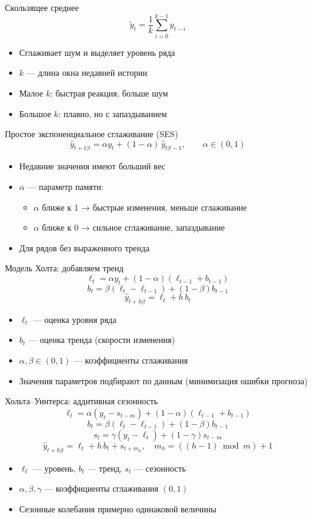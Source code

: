 \documentclass[aspectratio=1610,12pt]{beamer}
\begin{document}
\begin{frame}{Скользящее среднее}
\[
\tilde y_t=\frac{1}{k}\sum_{i=0}^{k-1} y_{t-i}
\]
\begin{itemize}
    \item Сглаживает шум и выделяет уровень ряда
    \item $k$ — длина окна недавней истории
    \item Малое $k$: быстрая реакция, больше шум
    \item Большое $k$: плавно, но с запаздыванием
\end{itemize}
\end{frame}


    \begin{frame}{Простое экспоненциальное сглаживание (SES)}
\[
\hat y_{t+1|t}
= \alpha y_t + (1-\alpha)\,\hat y_{t|t-1},
\qquad \alpha \in (0,1)
\]
\begin{itemize}
    \item Недавние значения имеют больший вес
    \item $\alpha$ — параметр памяти:
    \begin{itemize}
        \item $\alpha$ ближе к 1 → быстрые изменения, меньше сглаживание
        \item $\alpha$ ближе к 0 → сильное сглаживание, запаздывание
    \end{itemize}
    \item Для рядов без выраженного тренда
\end{itemize}
\end{frame}


\begin{frame}{Модель Холта: добавляем тренд}
\[
\ell_t=\alpha y_t + (1-\alpha)(\ell_{t-1}+b_{t-1})
\]
\[
b_t=\beta(\ell_t-\ell_{t-1}) + (1-\beta)b_{t-1}
\]
\[
\hat y_{t+h|t}=\ell_t + h\,b_t
\]
\begin{itemize}
    \item $\ell_t$ — оценка уровня ряда
    \item $b_t$ — оценка тренда (скорости изменения)
    \item $\alpha, \beta \in (0,1)$ — коэффициенты сглаживания
    \item Значения параметров подбирают по данным (минимизация ошибки прогноза)
\end{itemize}
\end{frame}


\begin{frame}{Хольта–Уинтерса: аддитивная сезонность}
\[
\ell_t=\alpha (y_t-s_{t-m}) + (1-\alpha)(\ell_{t-1}+b_{t-1})
\]
\[
b_t=\beta(\ell_t-\ell_{t-1}) + (1-\beta)b_{t-1}
\]
\[
s_t=\gamma (y_t-\ell_t) + (1-\gamma)s_{t-m}
\]
\[
\hat y_{t+h|t}=\ell_t + h\,b_t + s_{t+m_h}, \quad m_h=((h-1)\bmod m)+1
\]
\begin{itemize}
    \item $\ell_t$ — уровень, $b_t$ — тренд, $s_t$ — сезонность
    \item $\alpha, \beta, \gamma$ — коэффициенты сглаживания \((0,1)\)
    \item Сезонные колебания примерно одинаковой величины
\end{itemize}
\end{frame}
\end{document}
